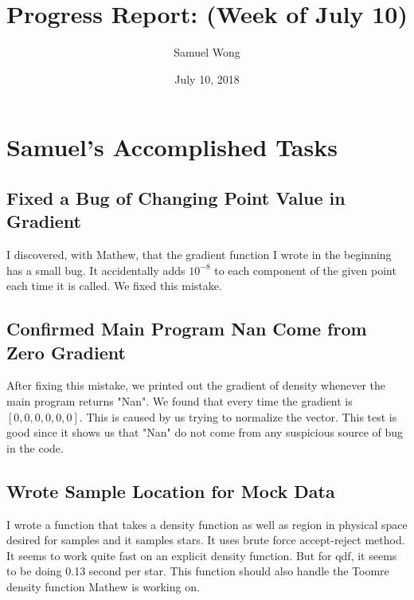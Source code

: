 \documentclass[12pt]{article}
\begin{document}
\title{Progress Report: (Week of July 10)}
\author{Samuel Wong}
\date{July 10, 2018}
\maketitle


\section{Samuel's Accomplished Tasks}
\subsection{Fixed a Bug of Changing Point Value in Gradient}
I discovered, with Mathew, that the gradient function I wrote in the beginning has a small bug. It accidentally adds $10^{-8}$ to each component of the given point each time it is called. We fixed this mistake.
\subsection{Confirmed Main Program Nan Come from Zero Gradient}
After fixing this mistake, we printed out the gradient of density whenever the main program returns "Nan". We found that every time the gradient is $[0,0,0,0,0,0]$. This is caused by us trying to normalize the vector. This test is good since it shows us that "Nan" do not come from any suspicious source of bug in the code.
\subsection{Wrote Sample Location for Mock Data}
I wrote a function that takes a density function as well as region in physical space desired for samples and it samples stars. It uses brute force accept-reject method. It seems to work quite fast on an explicit density function. But for qdf, it seems to be doing 0.13 second per star. This function should also handle the Toomre density function Mathew is working on.
\newpage
\end{document}
